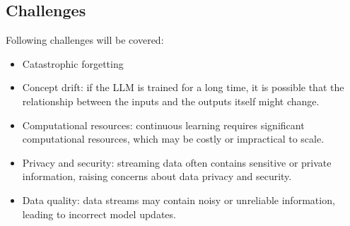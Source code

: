 \documentclass[runningheads]{llncs}
\begin{document}
\subsection{Challenges}
Following challenges will be covered:
\begin{itemize}
    \item Catastrophic forgetting \cite{Gupta23}
    \item Concept drift: if the LLM is trained for a long time, it is possible that the relationship between the inputs and the outputs itself might change.
    \item Computational resources: continuous learning requires significant computational resources, which may be costly or impractical to scale.
    \item Privacy and security:  streaming data often contains sensitive or private information, raising concerns about data privacy and security.
    \item Data quality: data streams may contain noisy or unreliable information, leading to incorrect model updates.
\end{itemize}
\end{document}
